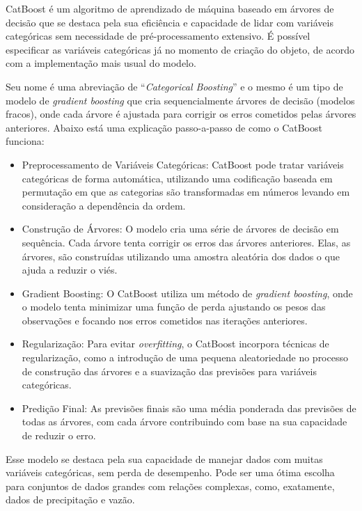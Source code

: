 CatBoost é um algoritmo de aprendizado de máquina baseado em árvores de decisão que se destaca pela sua eficiência e capacidade de lidar com variáveis categóricas sem necessidade de pré-processamento extensivo. É possível especificar as variáveis categóricas já no momento de criação do objeto, de acordo com a implementação mais usual do modelo.

Seu nome é uma abreviação de ``\textit{Categorical Boosting}'' e o mesmo é um tipo de modelo de \textit{gradient boosting} que cria sequencialmente árvores de decisão (modelos fracos), onde cada árvore é ajustada para corrigir os erros cometidos pelas árvores anteriores. Abaixo está uma explicação passo-a-passo de como o CatBoost funciona:

\begin{itemize}
\item Preprocessamento de Variáveis Categóricas: CatBoost pode tratar variáveis categóricas de forma automática, utilizando uma codificação baseada em permutação em que as categorias são transformadas em números levando em consideração a dependência da ordem.
\item Construção de Árvores: O modelo cria uma série de árvores de decisão em sequência. Cada árvore tenta corrigir os erros das árvores anteriores. Elas, as árvores, são construídas utilizando uma amostra aleatória dos dados o que ajuda a reduzir o viés.
\item Gradient Boosting: O CatBoost utiliza um método de \textit{gradient boosting}, onde o modelo tenta minimizar uma função de perda ajustando os pesos das observações e focando nos erros cometidos nas iterações anteriores.
\item Regularização: Para evitar \textit{overfitting}, o CatBoost incorpora técnicas de regularização, como a introdução de uma pequena aleatoriedade no processo de construção das árvores e a suavização das previsões para variáveis categóricas.
\item Predição Final: As previsões finais são uma média ponderada das previsões de todas as árvores, com cada árvore contribuindo com base na sua capacidade de reduzir o erro.
\end{itemize}

Esse modelo se destaca pela sua capacidade de manejar dados com muitas variáveis categóricas, sem perda de desempenho. Pode ser uma ótima escolha para conjuntos de dados grandes com relações complexas, como, exatamente, dados de precipitação e vazão.

